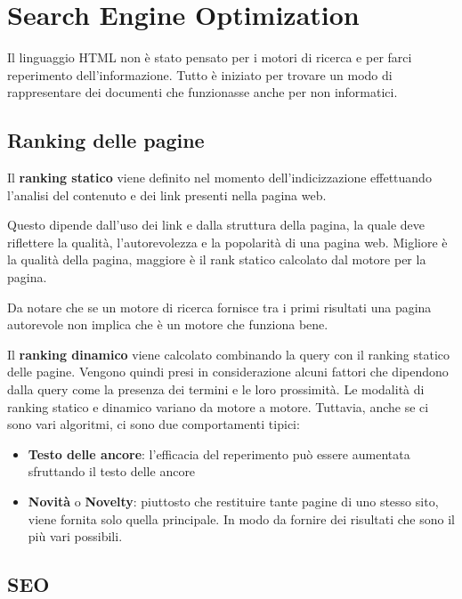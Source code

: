
\section{Search Engine Optimization}

Il linguaggio HTML non è stato pensato per i motori di ricerca e per farci reperimento dell'informazione. Tutto è iniziato per trovare un modo di rappresentare dei documenti che funzionasse anche per non informatici.

\subsection{Ranking delle pagine}

Il \textbf{ranking statico} viene definito nel momento dell'indicizzazione effettuando l'analisi del contenuto e dei link presenti nella pagina web.

Questo dipende dall'uso dei link e dalla struttura della pagina, la quale deve riflettere la qualità, l'autorevolezza e la popolarità di una pagina web. 
Migliore è la qualità della pagina, maggiore è il rank statico calcolato dal motore per la pagina.

Da notare che se un motore di ricerca fornisce tra i primi risultati una pagina autorevole non implica che è un motore che funziona bene.

Il \textbf{ranking dinamico} viene calcolato combinando la query con il ranking statico delle pagine. Vengono quindi presi in considerazione alcuni fattori che dipendono dalla query come la presenza dei termini e le loro prossimità.
Le modalità di ranking statico e dinamico variano da motore a motore.
Tuttavia, anche se ci sono vari algoritmi, ci sono due comportamenti tipici:

\begin{itemize}
	\item \textbf{Testo delle ancore}: l’efficacia del reperimento può essere aumentata sfruttando il testo delle ancore
	\item \textbf{Novità} o \textbf{Novelty}: piuttosto che restituire tante pagine di uno stesso sito, viene fornita solo quella principale. In modo da fornire dei risultati che sono il più vari possibili.
\end{itemize}

\subsection{SEO}

